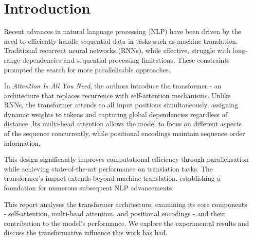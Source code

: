 \section{Introduction}

Recent advances in natural language processing (NLP) have been driven by the need to efficiently handle sequential data in tasks such as machine translation. Traditional recurrent neural networks (RNNs), while effective, struggle with long-range dependencies and sequential processing limitations. These constraints prompted the search for more parallelisable approaches.

In \textit{Attention Is All You Need}, the authors introduce the transformer - an architecture that replaces recurrence with self-attention mechanisms. Unlike RNNs, the transformer attends to all input positions simultaneously, assigning dynamic weights to tokens and capturing global dependencies regardless of distance. Its multi-head attention allows the model to focus on different aspects of the sequence concurrently, while positional encodings maintain sequence order information.

This design significantly improves computational efficiency through parallelisation while achieving state-of-the-art performance on translation tasks. The transformer's impact extends beyond machine translation, establishing a foundation for numerous subsequent NLP advancements.

This report analyses the transformer architecture, examining its core components - self-attention, multi-head attention, and positional encodings - and their contribution to the model's performance. We explore the experimental results and discuss the transformative influence this work has had.
